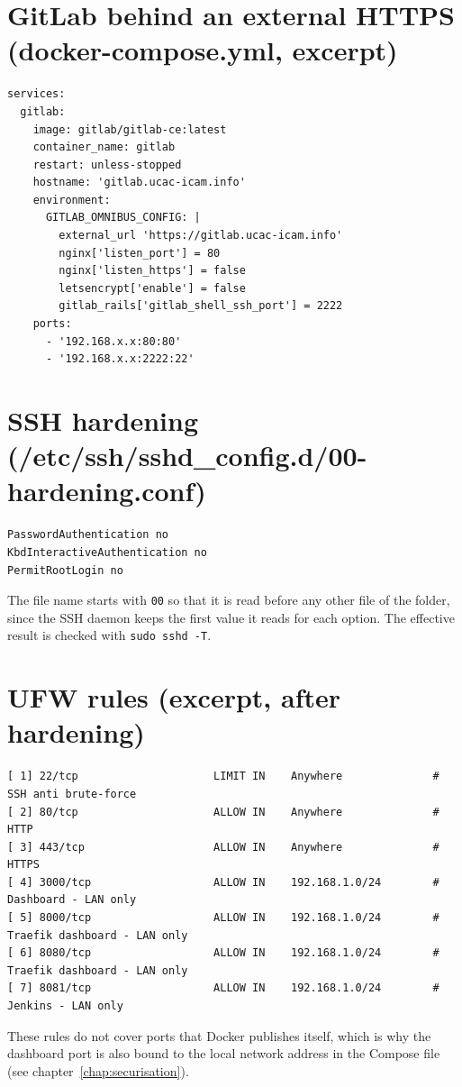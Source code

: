 \section{GitLab behind an external HTTPS (docker-compose.yml, excerpt)}
\begin{lstlisting}
services:
  gitlab:
    image: gitlab/gitlab-ce:latest
    container_name: gitlab
    restart: unless-stopped
    hostname: 'gitlab.ucac-icam.info'
    environment:
      GITLAB_OMNIBUS_CONFIG: |
        external_url 'https://gitlab.ucac-icam.info'
        nginx['listen_port'] = 80
        nginx['listen_https'] = false
        letsencrypt['enable'] = false
        gitlab_rails['gitlab_shell_ssh_port'] = 2222
    ports:
      - '192.168.x.x:80:80'
      - '192.168.x.x:2222:22'
\end{lstlisting}

\section{SSH hardening (/etc/ssh/sshd\_config.d/00-hardening.conf)}
\begin{lstlisting}
PasswordAuthentication no
KbdInteractiveAuthentication no
PermitRootLogin no
\end{lstlisting}

The file name starts with \texttt{00} so that it is read before any other file of the folder, since the SSH daemon keeps the first value it reads for each option. The effective result is checked with \texttt{sudo sshd -T}.

\section{UFW rules (excerpt, after hardening)}
\begin{lstlisting}
[ 1] 22/tcp                     LIMIT IN    Anywhere              # SSH anti brute-force
[ 2] 80/tcp                     ALLOW IN    Anywhere              # HTTP
[ 3] 443/tcp                    ALLOW IN    Anywhere              # HTTPS
[ 4] 3000/tcp                   ALLOW IN    192.168.1.0/24        # Dashboard - LAN only
[ 5] 8000/tcp                   ALLOW IN    192.168.1.0/24        # Traefik dashboard - LAN only
[ 6] 8080/tcp                   ALLOW IN    192.168.1.0/24        # Traefik dashboard - LAN only
[ 7] 8081/tcp                   ALLOW IN    192.168.1.0/24        # Jenkins - LAN only
\end{lstlisting}

These rules do not cover ports that Docker publishes itself, which is why the dashboard port is also bound to the local network address in the Compose file (see chapter~\ref{chap:securisation}).

